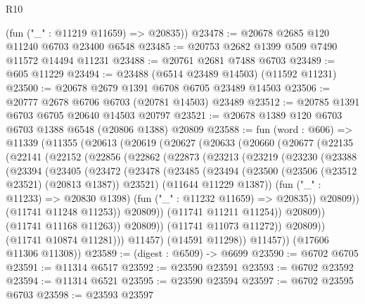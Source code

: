 \begin{lexlean}{R10}
\begin{coremodule}
{{{{{{{{{{{{{{{{{{{{{{{{{{{{{{{{{{{{{{{{{{{{{{{{{{{{{{{{{{{{{{{{{{{{{{{{{{{{{{{{{{{{      (fun ("_" : @11219 @11659) => @20835))
@23478 := @20678 @2685 @120 @11240 @6703 @23400 @6548
@23485 := @20753 @2682 @1399 @509 @7490 @11572 @14494 @11231
@23488 := @20761 @2681 @7488 @6703
@23489 := @605 @11229
@23494 := @23488 (@6514 @23489 @14503) (@11592 @11231)
@23500 := @20678 @2679 @1391 @6708 @6705 @23489 @14503
@23506 := @20777 @2678 @6706 @6703 (@20781 @14503) @23489
@23512 := @20785 @1391 @6703 @6705 @20640 @14503 @20797
@23521 := @20678 @1389 @120 @6703 @6703 @1388 @6548 (@20806 @1388) @20809
@23588 := fun (word : @606) =>
  @11339
    (@11355
      (@20613
        (@20619
          (@20627
            (@20633
              (@20660
                (@20677
                  (@22135
                    (@22141
                      (@22152
                        (@22856
                          (@22862
                            (@22873
                              (@23213
                                (@23219
                                  (@23230
                                    (@23388
                                      (@23394
                                        (@23405
                                          (@23472
                                            (@23478
                                              (@23485
                                                (@23494
                                                  (@23500
                                                    (@23506 (@23512 @23521) (@20813 @1387))
                                                    @23521)
                                                  (@11644 @11229 @1387))
                                                (fun ("_" : @11233) => @20830 @1398)
                                                (fun ("_" : @11232 @11659) => @20835))
                                              @20809))
                                          (@11741 @11248 @11253))
                                        @20809))
                                    (@11741 @11211 @11254))
                                  @20809))
                              (@11741 @11168 @11263))
                            @20809))
                        (@11741 @11073 @11272))
                      @20809))
                  (@11741 @10874 @11281)))
              @11457)
            (@14591 @11298))
          @11457))
      (@17606 @11306 @11308))
@23589 := (digest : @6509) -> @6699
@23590 := @6702 @6705
@23591 := @11314 @6517
@23592 := @23590 @23591
@23593 := @6702 @23592
@23594 := @11314 @6521
@23595 := @23590 @23594
@23597 := @6702 @23595 @6703
@23598 := @23593 @23597
}}}}}}}}}}}}}}}}}}}}}}}}}}}}}}}}}}}}}}}}}}}}}}}}}}}}}}}}}}}}}}}}}}}}}}}}}}}}}}}}}}}}
\end{coremodule}
\end{lexlean}
